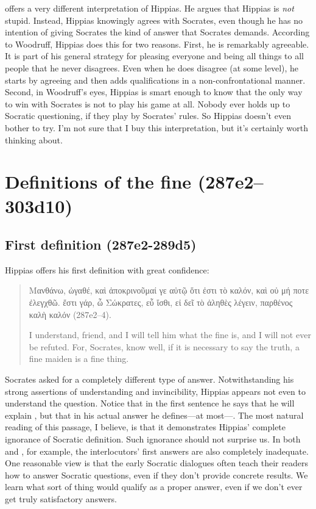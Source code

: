 \documentclass[12pt]{article}
\begin{document}
\citet{woodruff1982} offers a very different interpretation of Hippias.  He argues that Hippias is \emph{not} stupid.  Instead, Hippias knowingly agrees with Socrates, even though he has no intention of giving Socrates the kind of answer that Socrates demands.  According to Woodruff, Hippias does this for two reasons.  First, he is remarkably agreeable.  It is part of his general strategy for pleasing everyone and being all things to all people that he never disagrees.  Even when he does disagree (at some level), he starts by agreeing and then adds qualifications in a non-confrontational manner.  Second, in Woodruff's eyes, Hippias is smart enough to know that the only way to win with Socrates is not to play his game at all.  Nobody ever holds up to Socratic questioning, if they play by Socrates' rules.  So Hippias doesn't even bother to try.  I'm not sure that I buy this interpretation, but it's certainly worth thinking about.


\section{Definitions of the fine (287e2--303d10)}

\subsection{First definition (287e2-289d5)}

Hippias offers his first definition with great confidence:

\begin{quote}
    {\g Μανθάνω, ὠγαθέ, καὶ ἀποκρινοῦμαί γε αὐτῷ ὅτι ἐστι τὸ καλόν, καὶ οὐ μή ποτε ἐλεγχθῶ. ἔστι γάρ, ὦ Σώκρατες, εὖ ἴσθι, εἰ δεῖ τὸ ἀληθὲς λέγειν, παρθένος καλὴ καλόν} (287e2--4).

    I understand, friend, and I will tell him what the fine is, and I will not ever be refuted.  For, Socrates, know well, if it is necessary to say the truth, a fine maiden is a fine thing.
\end{quote}

Socrates asked for a completely different type of answer.  Notwithstanding his strong assertions of understanding and invincibility, Hippias appears not even to understand the question.  Notice that in the first sentence he says that he will explain , but that in his actual answer he defines---at most---.  The most natural reading of this passage, I believe, is that it demonstrates Hippias' complete ignorance of Socratic definition.  Such ignorance should not surprise us.  In both  and , for example, the interlocutors' first answers are also completely inadequate.  One reasonable view is that the early Socratic dialogues often teach their readers how to answer Socratic questions, even if they don't provide concrete results.  We learn what sort of thing would qualify as a proper answer, even if we don't ever get truly satisfactory answers.
\end{document}
